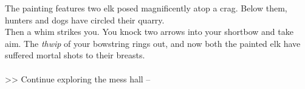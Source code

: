 The painting features two elk posed magnificently atop a crag. Below them, hunters and dogs have circled their quarry.\\

Then a whim strikes you. You knock two arrows into your shortbow and take aim. The \emph{thwip} of your bowstring rings out, and now both the painted elk have suffered mortal shots to their breasts.\\
\\

>> Continue exploring the mess hall -- 
